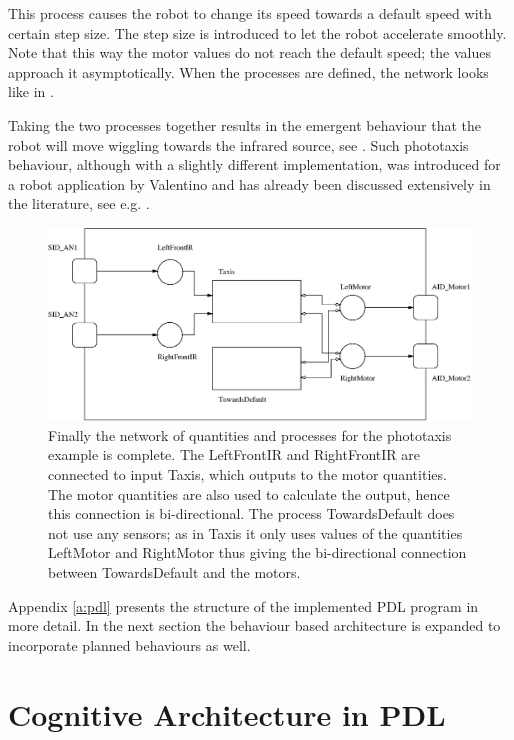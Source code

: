 This process causes the robot to change its speed towards a default speed with certain step size. The step size is introduced to let the robot accelerate smoothly. Note that this way the motor values do not reach the default speed; the values approach it asymptotically. When the processes are defined, the network looks like in .

Taking the two processes together results in the emergent behaviour that the robot will move wiggling towards the infrared source, see . Such phototaxis behaviour, although with a slightly different implementation, was introduced for a robot application by Valentino \citet{braitenberg:1984} and has already been discussed extensively in the literature, see e.g. \citep{steels:1994}.

\begin{figure}
\centerline{\includegraphics[width=12cm]{robots//pdl_network.eps}}
\caption{Finally the network of quantities and processes for the phototaxis example is complete. The LeftFrontIR and RightFrontIR are connected to input Taxis, which outputs to the motor quantities. The motor quantities are also used to calculate the output, hence this connection is bi-directional. The process TowardsDefault does not use any sensors; as in Taxis it only uses values of the quantities LeftMotor and RightMotor thus giving the bi-directional connection between TowardsDefault and the motors.}
\label{f:robots:pdl}
\end{figure}

Appendix \ref{a:pdl} presents the structure of the implemented PDL program in more detail. In the next section the behaviour based architecture is expanded to incorporate planned behaviours as well.


\section{Cognitive Architecture in PDL}\label{s:robots:architecture}
	
